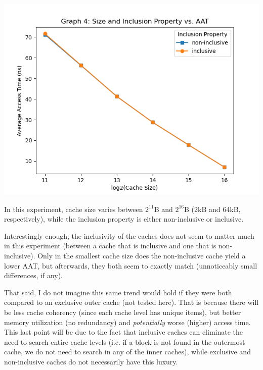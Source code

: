 \documentclass{article}
\begin{document}
    \includegraphics[width=\textwidth]{../graph_logs/graph4.png}

    In this experiment, cache size varies between $2^{11}$B and $2^{16}$B (2kB and 64kB, respectively), while 
    the inclusion property is either non-inclusive or inclusive.

    Interestingly enough, the inclusivity of the caches does not seem to matter much in this experiment (between a cache 
    that is inclusive and one that is non-inclusive). Only in the smallest cache size does the non-inclusive cache 
    yield a lower AAT, but afterwards, they both seem to exactly match (unnoticeably small differences, if any).

    That said, I do not imagine this same trend would hold if they were both compared to an exclusive outer cache (not 
    tested here). That is because there will be less cache coherency (since each cache level has unique items), but 
    better memory utilization (no redundancy) and \textit{potentially} worse (higher) access time. This last point will 
    be due to the fact that inclusive caches can eliminate the need to search entire cache levels (i.e. if a block is not 
    found in the outermost cache, we do not need to search in any of the inner caches), while exclusive and non-inclusive 
    caches do not necessarily have this luxury.
\end{document}
